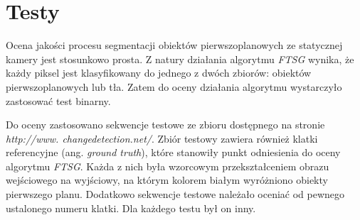 \documentclass[10pt,a4paper]{article}
\begin{document}



\section{Testy}

Ocena jakości procesu segmentacji obiektów pierwszoplanowych ze statycznej kamery jest stosunkowo prosta. Z natury działania algorytmu \textit{FTSG} wynika, że każdy piksel jest klasyfikowany do jednego z dwóch zbiorów: obiektów pierwszoplanowych lub tła. Zatem do oceny działania algorytmu wystarczyło zastosować test binarny. 

Do oceny zastosowano sekwencje testowe ze zbioru dostępnego na stronie \textit{http://www.
changedetection.net/}. Zbiór testowy zawiera również klatki referencyjne
(ang. \textit{ground truth}), które stanowiły punkt odniesienia do oceny algorytmu \textit{FTSG}. Każda z nich była wzorcowym przekształceniem obrazu wejściowego na wyjściowy, na którym kolorem białym wyróżniono obiekty pierwszego planu. Dodatkowo sekwencje testowe należało oceniać od pewnego ustalonego numeru klatki. Dla każdego testu był on inny.
\end{document}
